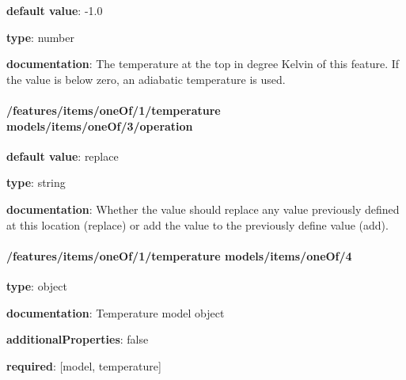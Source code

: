 \begin{itemized}
\item {\bf default value}: -1.0
\item {\bf type}: number
\item {\bf documentation}: The temperature at the top in degree Kelvin of this feature. If the value is below zero, an adiabatic temperature is used.
\end{itemized}\paragraph{/features/items/oneOf/1/temperature models/items/oneOf/3/operation} \begin{itemized}
\item {\bf default value}: replace
\item {\bf type}: string
\item {\bf documentation}: Whether the value should replace any value previously defined at this location (replace) or add the value to the previously define value (add).
\end{itemized}\paragraph{/features/items/oneOf/1/temperature models/items/oneOf/4} \begin{itemized}
\item {\bf type}: object
\item {\bf documentation}: Temperature model object
\item {\bf additionalProperties}: false
\item {\bf required}: [model, temperature]\end{itemized}

